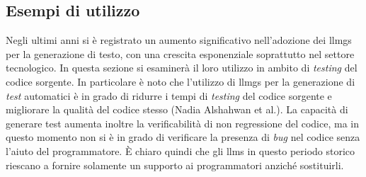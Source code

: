     \subsection{Esempi di utilizzo}
    Negli ultimi anni si è registrato un aumento significativo nell'adozione dei \glspl{llmg} per la generazione di testo, con una crescita esponenziale soprattutto nel settore tecnologico.
    In questa sezione si esaminerà il loro utilizzo in ambito di \textit{testing} del codice sorgente.
    In particolare è noto che l'utilizzo di \glspl{llmg} per la generazione di \textit{test} automatici è in grado di ridurre i tempi di \textit{testing} del codice sorgente e migliorare la qualità del codice stesso (Nadia Alshahwan et al.\cite{article:Alshahwan2024AutomatedUT}).
    La capacità di generare test aumenta inoltre la verificabilità di non regressione del codice, ma in questo momento non si è in grado di verificare la presenza di \textit{bug} nel codice senza l'aiuto del programmatore. È chiaro quindi che gli \glspl{llm} in questo periodo storico riescano a fornire solamente un supporto ai programmatori anziché sostituirli.
